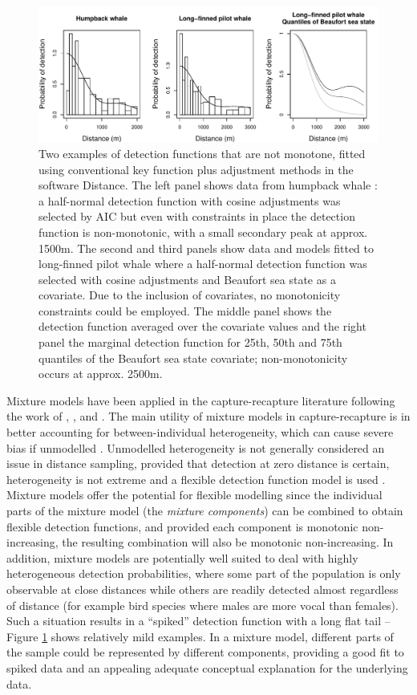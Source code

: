 \documentclass[authoryear,preprint,review,12pt]{elsarticle}
\begin{document}
\begin{figure}
\centering
\includegraphics[width=\textwidth]{figs/figure1.pdf}
\caption{Two examples of detection functions that are not monotone, fitted using conventional key function plus adjustment methods in the software Distance. The left panel shows data from humpback whale \citep{Williams:2007tc}: a half-normal detection function with cosine adjustments was selected by AIC but even with constraints in place the detection function is non-monotonic, with a small secondary peak at approx. 1500m. The second and third panels show data and models fitted to long-finned pilot whale \citep{Pike:2003ug} where a half-normal detection function was selected with cosine adjustments and Beaufort sea state as a covariate. Due to the inclusion of covariates, no monotonicity constraints could be employed.  The middle panel shows the detection function averaged over the covariate values and the right panel the marginal detection function for 25th, 50th and 75th quantiles of the Beaufort sea state covariate; non-monotonicity occurs at approx. 2500m.}
\label{fig1}
\end{figure}

Mixture models have been applied in the capture-recapture literature following the work of \cite{Pledger:2000tc}, \cite{Dorazio:2003uf}, \cite{Pledger:2005wy} and \cite{Morgan:2008wy}. The main utility of mixture models in capture-recapture is in better accounting for between-individual heterogeneity, which can cause severe bias if unmodelled \citep{Link:2003wo}. Unmodelled heterogeneity is not generally considered an issue in distance sampling, provided that detection at zero distance is certain, heterogeneity is not extreme and a flexible detection function model is used \citep[][Section 11.12]{Buckland:2004ts}. Mixture models offer the potential for flexible modelling since the individual parts of the mixture model (the \textit{mixture components}) can be combined to obtain flexible detection functions, and provided each component is monotonic non-increasing, the resulting combination will also be monotonic non-increasing. In addition, mixture models are potentially well suited to deal with highly heterogeneous detection probabilities, where some part of the population is only observable at close distances while others are readily detected almost regardless of distance (for example bird species where males are more vocal than females). Such a situation results in a ``spiked'' detection function with a long flat tail -- Figure \ref{fig1} shows relatively mild examples. In a mixture model, different parts of the sample could be represented by different components, providing a good fit to spiked data and an appealing adequate conceptual explanation for the underlying data.
\end{document}
